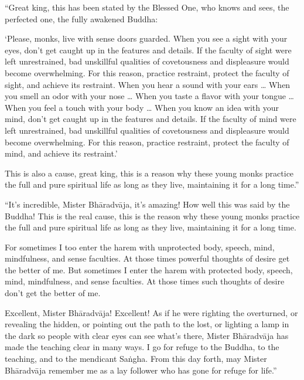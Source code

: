 \documentclass[12pt,openany]{book}%
\begin{document}
“Great king, this has been stated by the Blessed One, who knows and sees, the perfected one, the fully awakened Buddha: 

‘Please, monks, live with sense doors guarded. When you see a sight with your eyes, don’t get caught up in the features and details. If the faculty of sight were left unrestrained, bad unskillful qualities of covetousness and displeasure would become overwhelming. For this reason, practice restraint, protect the faculty of sight, and achieve its restraint. When you hear a sound with your ears … When you smell an odor with your nose … When you taste a flavor with your tongue … When you feel a touch with your body … When you know an idea with your mind, don’t get caught up in the features and details. If the faculty of mind were left unrestrained, bad unskillful qualities of covetousness and displeasure would become overwhelming. For this reason, practice restraint, protect the faculty of mind, and achieve its restraint.’ 

This is also a cause, great king, this is a reason why these young monks practice the full and pure spiritual life as long as they live, maintaining it for a long time.” 

“It’s incredible, Mister \textsanskrit{Bhāradvāja}, it’s amazing! How well this was said by the Buddha! This is the real cause, this is the reason why these young monks practice the full and pure spiritual life as long as they live, maintaining it for a long time. 

For sometimes I too enter the harem with unprotected body, speech, mind, mindfulness, and sense faculties. At those times powerful thoughts of desire get the better of me. But sometimes I enter the harem with protected body, speech, mind, mindfulness, and sense faculties. At those times such thoughts of desire don’t get the better of me. 

Excellent, Mister \textsanskrit{Bhāradvāja}! Excellent! As if he were righting the overturned, or revealing the hidden, or pointing out the path to the lost, or lighting a lamp in the dark so people with clear eyes can see what’s there, Mister \textsanskrit{Bhāradvāja} has made the teaching clear in many ways. I go for refuge to the Buddha, to the teaching, and to the mendicant \textsanskrit{Saṅgha}. From this day forth, may Mister \textsanskrit{Bhāradvāja} remember me as a lay follower who has gone for refuge for life.” 
\end{document}
